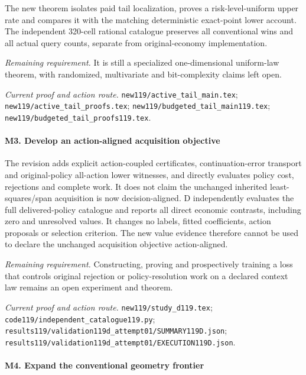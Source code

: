 The new theorem isolates paid tail localization, proves a risk-level-uniform upper rate and compares it with the matching deterministic exact-point lower account. The independent 320-cell rational catalogue preserves all conventional wins and all actual query counts, separate from original-economy implementation.

\par\emph{Remaining requirement.} It is still a specialized one-dimensional uniform-law theorem, with randomized, multivariate and bit-complexity claims left open.

\par\emph{Current proof and action route.} \nolinkurl{new119/active_tail_main.tex}; \nolinkurl{new119/active_tail_proofs.tex}; \nolinkurl{new119/budgeted_tail_main119.tex}; \nolinkurl{new119/budgeted_tail_proofs119.tex}.

\paragraph{M3. Develop an action-aligned acquisition objective}

The revision adds explicit action-coupled certificates, continuation-error transport and original-policy all-action lower witnesses, and directly evaluates policy cost, rejections and complete work. It does not claim the unchanged inherited least-squares/\allowbreak{}span acquisition is now decision-aligned. D independently evaluates the full delivered-policy catalogue and reports all direct economic contrasts, including zero and unresolved values. It changes no labels, fitted coefficients, action proposals or selection criterion. The new value evidence therefore cannot be used to declare the unchanged acquisition objective action-aligned.

\par\emph{Remaining requirement.} Constructing, proving and prospectively training a loss that controls original rejection or policy-resolution work on a declared context law remains an open experiment and theorem.

\par\emph{Current proof and action route.} \nolinkurl{new119/study_d119.tex}; \nolinkurl{code119/independent_catalogue119.py}; \nolinkurl{results119/validation119d_attempt01/SUMMARY119D.json}; \nolinkurl{results119/validation119d_attempt01/EXECUTION119D.json}.

\paragraph{M4. Expand the conventional geometry frontier}

